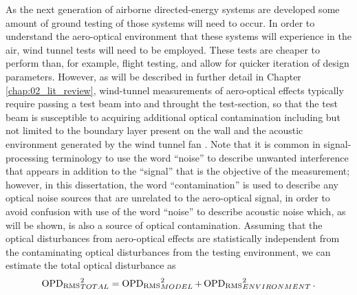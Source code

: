 As the next generation of airborne directed-energy systems are developed some amount of ground testing of those systems will need to occur.
In order to understand the aero-optical environment that these systems will experience in the air, wind tunnel tests will need to be employed.
These tests are cheaper to perform than, for example, flight testing, and allow for quicker iteration of design parameters.
However, as will be described in further detail in Chapter \ref{chap:02_lit_review}, wind-tunnel measurements of aero-optical effects typically require passing a test beam into and throught the test-section, so that the test beam is susceptible to acquiring additional optical contamination including but not limited to the boundary layer present on the wall and the acoustic environment generated by the wind tunnel fan \cite{Gordeyev-2014-jcJndkHM}.
Note that it is common in signal-processing terminology to use the word “noise” to describe unwanted interference that appears in addition to the “signal” that is the objective of the measurement; however, in this dissertation, the word “contamination” is used to describe any optical noise sources that are unrelated to the aero-optical signal, in order to avoid confusion with use of the word “noise” to describe acoustic noise which, as will be shown, is also a source of optical contamination.
Assuming that the optical disturbances from aero-optical effects are statistically independent from the contaminating optical disturbances from the testing environment, we can estimate the total optical disturbance as
\begin{equation}
  \operatorname{OPD_{RMS}}_{TOTAL}^2 = \operatorname{OPD_{RMS}}_{MODEL}^2+\operatorname{OPD_{RMS}}_{ENVIRONMENT}^2 \textrm{.}
  \label{eqn:01_combined_opd}
\end{equation}

